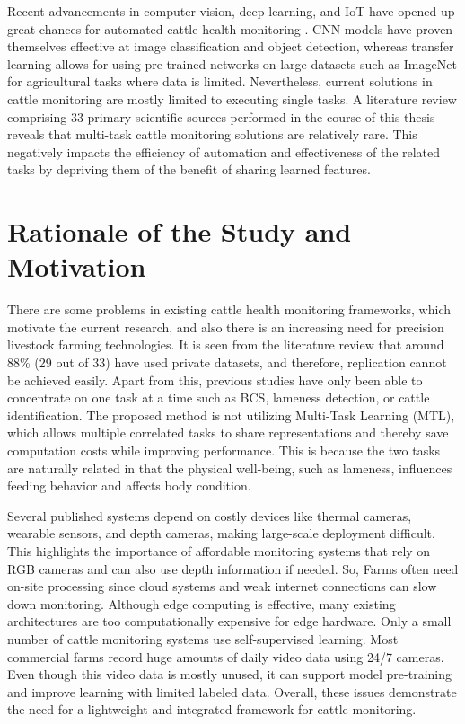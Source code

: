 Recent advancements in computer vision, deep learning, and IoT have opened up great chances for automated cattle health monitoring \cite{neethirajan2020digitalization}. CNN models have proven themselves effective at image classification and object detection, whereas transfer learning allows for using pre-trained networks on large datasets such as ImageNet for agricultural tasks where data is limited. Nevertheless, current solutions in cattle monitoring are mostly limited to executing single tasks. A literature review comprising 33 primary scientific sources performed in the course of this thesis reveals that multi-task cattle monitoring solutions are relatively rare. This negatively impacts the efficiency of automation and effectiveness of the related tasks by depriving them of the benefit of sharing learned features.


\section{Rationale of the Study and Motivation}

There are some problems in existing cattle health monitoring frameworks, which motivate the current research, and also there is an increasing need for precision livestock farming technologies. It is seen from the literature review that around 88\% (29 out of 33) have used private datasets, and therefore, replication cannot be achieved easily. Apart from this, previous studies have only been able to concentrate on one task at a time such as BCS, lameness detection, or cattle identification. The proposed method is not utilizing Multi-Task Learning (MTL), which allows multiple correlated tasks to share representations and thereby save computation costs while improving performance. This is because the two tasks are naturally related in that the physical well-being, such as lameness, influences feeding behavior and affects body condition.

Several published systems depend on costly devices like thermal cameras, wearable sensors, and depth cameras, making large-scale deployment difficult. This highlights the importance of affordable monitoring systems that rely on RGB cameras and can also use depth information if needed. So, Farms often need on-site processing since cloud systems and weak internet connections can slow down monitoring. Although edge computing is effective, many existing architectures are too computationally expensive for edge hardware. Only a small number of cattle monitoring systems use self-supervised learning. Most commercial farms record huge amounts of daily video data using 24/7 cameras. Even though this video data is mostly unused, it can support model pre-training and improve learning with limited labeled data. Overall, these issues demonstrate the need for a lightweight and integrated framework for cattle monitoring.


